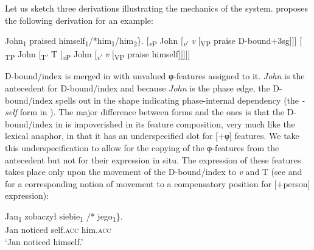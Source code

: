 \documentclass[output=paper,nonflat,colorlinks,citecolor=brown,newtxmath]{langsci/langscibook}
\begin{document}
Let us sketch three derivations illustrating the mechanics of the system. \cite{safir2014} proposes the following derivation for an  example:

\ea\label{ex:witkos:9}
\ea John\textsubscript{1} praised \minsp{\{} himself\textsubscript{1}/*him\textsubscript{1}/him\textsubscript{2}\}.
\ex $[$\textsubscript{\textit{v}P} John $[$\textsubscript{\textit{v}$'$} \textit{v} $[$\textsubscript{VP} praise D-bound+3sg$]]]$
\ex $[$\textsubscript{TP} John $[$\textsubscript{T$'$} T $[$\textsubscript{\textit{v}P} John $[$\textsubscript{\textit{v}$'$} \textit{v} $[$\textsubscript{VP} praise himself$]]]]]$
\z\z


\noindent D-bound/index is merged in with unvalued φ-features assigned to it. \textit{John} is the antecedent for D-bound/index and because \textit{John} is the phase edge, the D-bound/index spells out in the shape indicating phase-internal dependency (the \textit{-self} form in ). The major difference between   forms and the  ones is that the D-bound/index in  is impoverished in its feature composition, very much like the  lexical anaphor, in that it has an underspecified slot for [$+$φ] features. We take this underspecification to allow for the copying of the φ-features from the antecedent but not for their expression in situ. The expression of these features takes place only upon the movement of the D-bound/index to \textit{v} and T (see \citealt{bejar2003} and \citealt{franks2017} for a corresponding notion of  movement to a compensatory position for $[+$person$]$ expression):

\ea\label{ex:witkos:10}
\ea \gll Jan\textsubscript{1} zobaczył \minsp{\{} siebie\textsubscript{1} /*\hspace{-2pt} jego\textsubscript{1}\}. \label{ex:witkos:10a}\\
Jan noticed {} self.\textsc{acc} {} him.\textsc{acc}\\
\glt `Jan noticed himself.'

\end{document}
